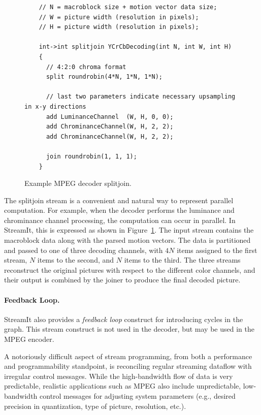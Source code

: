 \begin{figure}[t]
  \begin{scriptsize}
    \begin{verbatim}
	// N = macroblock size + motion vector data size;
	// W = picture width (resolution in pixels);
	// H = picture width (resolution in pixels);

	int->int splitjoin YCrCbDecoding(int N, int W, int H)
	{
	  // 4:2:0 chroma format
	  split roundrobin(4*N, 1*N, 1*N);

	  // last two parameters indicate necessary upsampling in x-y directions
	  add LuminanceChannel  (W, H, 0, 0);
	  add ChrominanceChannel(W, H, 2, 2);
	  add ChrominanceChannel(W, H, 2, 2);

	  join roundrobin(1, 1, 1);  
	}
    \end{verbatim}
  \end{scriptsize}
  \caption{Example MPEG decoder splitjoin.}
  \label{fig:decoder-sj}
\end{figure}

The splitjoin stream is a convenient and natural way to represent
parallel computation. For example, when the decoder performs the
luminance and chrominance channel processing, the computation can
occur in parallel. In StreamIt, this is expressed as shown in
Figure~\ref{fig:decoder-sj}. The input stream contains the
macroblock data along with the parsed motion vectors. The data is
partitioned and passed to one of three decoding channels, with $4N$
items assigned to the first stream, $N$ items to the second, and $N$
items to the third. The three streams reconstruct the original
pictures with respect to the different color channels, and their
output is combined by the joiner to produce the final decoded picture.

\paragraph{Feedback Loop.}
StreamIt also provides a {\it feedback loop} construct for introducing
cycles in the graph. This stream construct is not used in the decoder,
but may be used in the MPEG encoder.

\label{sec:messaging}
A notoriously difficult aspect of stream programming, from both a
performance and programmability standpoint, is reconciling regular
streaming dataflow with irregular control messages.  While the
high-bandwidth flow of data is very predictable, realistic
applications such as MPEG also include unpredictable, low-bandwidth
control messages for adjusting system parameters (e.g., desired
precision in quantization, type of picture, resolution, etc.).

